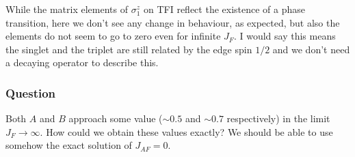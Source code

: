 \documentclass[12pt]{report}
\newcommand{\s}{\sigma}
\begin{document}
%
While the matrix elements of $\s_1^z$ on TFI reflect the existence of a phase transition, here we don't see any change in behaviour, as expected, but also the elements do not seem to go to zero even for infinite $J_F$. I would say this means the singlet and the triplet are still related by the edge spin $1/2$ and we don't need a decaying operator to describe this.

\subsubsection*{Question}
Both $A$ and $B$ approach some value ($\sim0.5$ and $\sim0.7$ respectively) in the limit $J_F \rightarrow \infty$. How could we obtain these values exactly? We should be able to use somehow the exact solution of $J_{AF}=0$.
\end{document}
